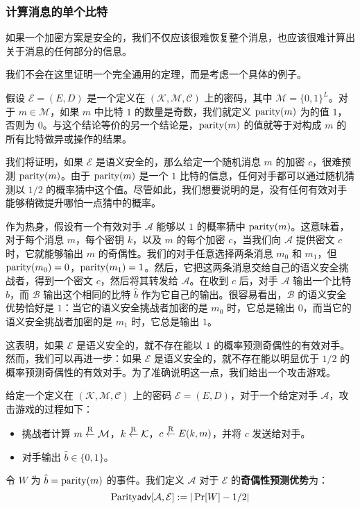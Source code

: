 \subsubsection{计算消息的单个比特}

如果一个加密方案是安全的，我们不仅应该很难恢复整个消息，也应该很难计算出关于消息的任何部分的信息。

我们不会在这里证明一个完全通用的定理，而是考虑一个具体的例子。

假设 $\mathcal{E}=(E,D)$ 是一个定义在 $(\mathcal{K},\mathcal{M},\mathcal{C})$ 上的密码，其中 $\mathcal{M}=\{0,1\}^L$。对于 $m\in\mathcal{M}$，如果 $m$ 中比特 $1$ 的数量是奇数，我们就定义 ${\rm parity}(m)$ 为的值 $1$，否则为 $0$。与这个结论等价的另一个结论是，${\rm parity}(m)$ 的值就等于对构成 $m$ 的所有比特做异或操作的结果。

我们将证明，如果 $\mathcal{E}$ 是语义安全的，那么给定一个随机消息 $m$ 的加密 $c$，很难预测 ${\rm parity}(m)$。由于 ${\rm parity}(m)$ 是一个 $1$ 比特的信息，任何对手都可以通过随机猜测以 ${1}/{2}$ 的概率猜中这个值。尽管如此，我们想要说明的是，没有任何有效对手能够稍微提升哪怕一点猜中的概率。

作为热身，假设有一个有效对手 $\mathcal{A}$ 能够以 $1$ 的概率猜中 ${\rm parity}(m)$。这意味着，对于每个消息 $m$，每个密钥 $k$，以及 $m$ 的每个加密 $c$，当我们向 $\mathcal{A}$ 提供密文 $c$ 时，它就能够输出 $m$ 的奇偶性。我们的对手任意选择两条消息 $m_0$ 和 $m_1$，但 ${\rm parity}(m_0)=0$，${\rm parity}(m_1)=1$。然后，它把这两条消息交给自己的语义安全挑战者，得到一个密文 $c$，然后将其转发给 $\mathcal{A}$。在收到 $c$ 后，对手 $\mathcal{A}$ 输出一个比特 $\hat b$，而 $\mathcal{B}$ 输出这个相同的比特 $\hat b$ 作为它自己的输出。很容易看出，$\mathcal{B}$ 的语义安全优势恰好是 $1$：当它的语义安全挑战者加密的是 $m_0$ 时，它总是输出 $0$，而当它的语义安全挑战者加密的是 $m_1$ 时，它总是输出 $1$。

这表明，如果 $\mathcal{E}$ 是语义安全的，就不存在能以 $1$ 的概率预测奇偶性的有效对手。然而，我们可以再进一步：如果 $\mathcal{E}$ 是语义安全的，就不存在能以明显优于 ${1}/{2}$ 的概率预测奇偶性的有效对手。为了准确说明这一点，我们给出一个攻击游戏。

\begin{game}[奇偶性预测]\label{game:2-3}
给定一个定义在 $(\mathcal{K},\mathcal{M},\mathcal{C})$ 上的密码 $\mathcal{E}=(E,D)$，对于一个给定对手 $\mathcal{A}$，攻击游戏的过程如下：
\begin{itemize}
	\item 挑战者计算 $m\overset{\rm R}\leftarrow\mathcal{M}$，$k\overset{\rm R}\leftarrow\mathcal{K}$，$c\overset{\rm R}\leftarrow E(k,m)$，并将 $c$ 发送给对手。
	\item 对手输出 $\hat b\in\{0,1\}$。
\end{itemize}

令 $W$ 为 $\hat b={\rm parity}(m)$ 的事件。我们定义 $\mathcal{A}$ 对于 $\mathcal{E}$ 的\textbf{奇偶性预测优势}为：
\[
{\rm Parity\mathsf{adv}}[\mathcal{A},\mathcal{E}]:=|\Pr[W]-{1}/{2}|
\]
\end{game}

